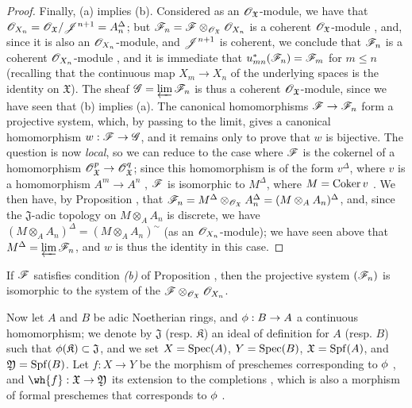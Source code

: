 \begin{proof}
Finally, (a) implies (b).
Considered as an $\mathscr{O}_\mathfrak{X}$-module, we have that $\mathscr{O}_{X_n}=\mathscr{O}_\mathfrak{X}/\mathscr{J}^{n+1}=A_n^\Delta$; but $\mathscr{F}_n=\mathscr{F}\otimes_{\mathscr{O}_\mathfrak{X}}\mathscr{O}_{X_n}$ is a coherent $\mathscr{O}_\mathfrak{X}$-module , and, since it is also an $\mathscr{O}_{X_n}$-module, and $\mathscr{J}^{n+1}$ is coherent, we conclude that $\mathscr{F}_n$ is a coherent $\mathscr{O}_{X_n}$-module , and it is immediate that $u_{mn}^*(\mathscr{F}_n)=\mathscr{F}_m$ for $m\leq n$ (recalling that the continuous map $X_m\to X_n$ of the underlying spaces is the identity on $\mathfrak{X}$).
The sheaf $\mathscr{G}=\varprojlim\mathscr{F}_n$ is thus a coherent $\mathscr{O}_\mathfrak{X}$-module, since we have seen that (b) implies (a). The canonical homomorphisms $\sh{F}\to\sh{F}_n$ form a projective system, which, by passing to the limit, gives a canonical homomorphism $w:\sh{F}\to\sh{G}$, and it remains only to prove that $w$ is bijective.
The question is now \emph{local}, so we can reduce to the case where $\mathscr{F}$ is the cokernel of a homomorphism $\sh{O}_\mathfrak{X}^p\to\sh{O}_\mathfrak{X}^q$; since this homomorphism is of the form $v^\Delta$, where $v$ is a homomorphism $A^m\to A^n$ , $\mathscr{F}$ is isomorphic to $M^\Delta$, where $M=\operatorname{Coker}{v}$ .
We then have, by Proposition , that $\mathscr{F}_n=M^\Delta\otimes_{\mathscr{O}_\mathfrak{X}}A_n^\Delta=(M\otimes_A A_n)^\Delta$, and, since the $\mathfrak{J}$-adic topology on $M\otimes_A A_n$ is discrete, we have $(M\otimes_A A_n)^\Delta=(M\otimes_A A_n)^\sim$ (as an $\mathscr{O}_{X_n}$-module); we have seen above that $M^\Delta=\varprojlim\mathscr{F}_n$, and $w$ is thus the identity in this case.
\end{proof}

\begin{corollary}[10.10.6]
\label{1.10.10.6}
If $\mathscr{F}$ satisfies condition \emph{(b)} of Proposition , then the projective system $(\mathscr{F}_n)$ is isomorphic to the system of the $\mathscr{F}\otimes_{\mathscr{O}_\mathfrak{X}}\mathscr{O}_{X_n}$.
\end{corollary}

\begin{env}[10.10.7]
\label{1.10.10.7}
Now let $A$ and $B$ be adic Noetherian rings, and $\vphi:B\to A$ a continuous homomorphism; we denote by $\mathfrak{J}$ (resp. $\mathfrak{K}$) an ideal of definition for $A$ (resp. $B$) such that $\phi(\mathfrak{K})\subset\mathfrak{J}$, and we set $X=\operatorname{Spec}(A)$, $Y=\operatorname{Spec}(B)$, $\mathfrak{X}=\operatorname{Spf}(A)$, and $\mathfrak{Y}=\operatorname{Spf}(B)$.
Let $f:X\to Y$ be the morphism of preschemes corresponding to $\phi$ , and $\wh{f}:\mathfrak{X}\to\mathfrak{Y}$ its extension to the completions , which is also a morphism of formal preschemes that corresponds to $\phi$ .
\end{env}

